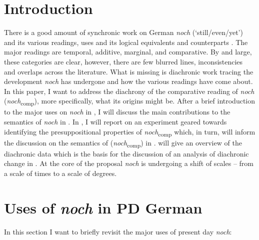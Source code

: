 \documentclass[output=paper,
modfonts
]{langscibook}
\author{Martin Kopf-Giammanco\affiliation{Universität des Saarlandes}}
\begin{document}
\maketitle

\section{Introduction}\label{sec_intro}
There is a good amount of synchronic work on German \textit{noch} (`still/even/yet') and its various readings, uses and its logical equivalents and counterparts \citep[e.g.][]{koenig1977,loebner1989,Ippolito2007,umbach2009a_comp,umbach2009b_add,umbach2012,beck2016a_sub,beck2016b_disc}. The major readings are temporal, additive, marginal, and comparative. By and large, these categories are clear, however, there are few blurred lines, inconsistencies and overlaps across the literature. What is missing is diachronic work tracing the development \textit{noch} has undergone and how the various readings have come about. In this paper, I want to address the diachrony of the comparative reading of \textit{noch} (\textit{noch}\textsubscript{comp}), more specifically, what its origins might be. After a brief introduction to the major uses on \textit{noch} in , I will discuss the main contributions to the semantics of \textit{noch} in . In , I will report on an experiment geared towards identifying the presuppositional properties of \textit{noch}\textsubscript{comp} which, in turn, will inform the discussion on the semantics of (\textit{noch}\textsubscript{comp}) in .  will give an overview of the diachronic data which is the basis for the discussion of an analysis of diachronic change in . At the core of the proposal \textit{noch} is undergoing a shift of scales -- from a scale of times to a scale of degrees. 

\section{Uses of \textit{noch} in PD German} \label{sec_major_readings}

In this section I want to briefly revisit the major uses of present day \textit{noch}:
\end{document}
